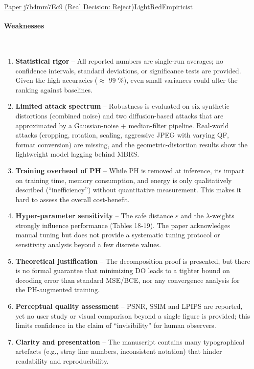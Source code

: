 \documentclass{article} %
\begin{document}
\begin{reviewbox}{\href{https://openreview.net/forum?id=j7b4mm7Ec9}{Paper j7b4mm7Ec9 (Real Decision: Reject)}}{LightRed}{Empiricist}
\paragraph{Weaknesses}
\leavevmode\\[0.1em]
\begin{enumerate}[leftmargin=0.5em, itemsep=0pt, topsep=0pt]
    \item \textbf{Statistical rigor} – All reported numbers are single-run averages; no confidence intervals, standard deviations, or significance tests are provided. Given the high accuracies ($\approx$ 99 \%), even small variances could alter the ranking against baselines.  
    \item \textbf{Limited attack spectrum} – Robustness is evaluated on six synthetic distortions (combined noise) and two diffusion-based attacks that are approximated by a Gaussian-noise + median-filter pipeline. Real-world attacks (cropping, rotation, scaling, aggressive JPEG with varying QF, format conversion) are missing, and the geometric-distortion results show the lightweight model lagging behind MBRS.  
    \item \textbf{Training overhead of PH} – While PH is removed at inference, its impact on training time, memory consumption, and energy is only qualitatively described (“inefficiency”) without quantitative measurement. This makes it hard to assess the overall cost-benefit.  
    \item \textbf{Hyper-parameter sensitivity} – The safe distance $\varepsilon$ and the $\lambda$-weights strongly influence performance (Tables 18-19). The paper acknowledges manual tuning but does not provide a systematic tuning protocol or sensitivity analysis beyond a few discrete values.  
    \item \textbf{Theoretical justification} – The decomposition proof is presented, but there is no formal guarantee that minimizing DO leads to a tighter bound on decoding error than standard MSE/BCE, nor any convergence analysis for the PH-augmented training.  
    \item \textbf{Perceptual quality assessment} – PSNR, SSIM and LPIPS are reported, yet no user study or visual comparison beyond a single figure is provided; this limits confidence in the claim of “invisibility” for human observers.  
    \item \textbf{Clarity and presentation} – The manuscript contains many typographical artefacts (e.g., stray line numbers, inconsistent notation) that hinder readability and reproducibility.  
\end{enumerate}


\end{reviewbox}
\end{document}
